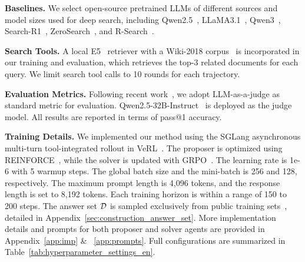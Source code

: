 \documentclass[10pt, a4paper, logo]{googledeepmind} %
\begin{document}
\textbf{Baselines.} We select open-source pretrained LLMs of different sources and model sizes used for deep search, including Qwen2.5~\citep{yang2024qwen2p5}, LLaMA3.1~\citep{dubey2024llama}, Qwen3~\citep{yang2025qwen3}, Search-R1~\citep{jin2025search,jin2025empirical}, ZeroSearch~\citep{sun2025zerosearch}, and R-Search~\citep{zhao2025rsearch}.

\textbf{Search Tools.} A local E5~\citep{wang2022text} retriever with a Wiki-2018 corpus~\citep{karpukhin2020dense} is incorporated in our training and evaluation, which retrieves the top-3 related documents for each query. We limit search tool calls to 10 rounds for each trajectory.

\textbf{Evaluation Metrics.} Following recent work~\citep{gao2025asearcher}, we adopt LLM-as-a-judge as standard metric for evaluation. Qwen2.5-32B-Instruct~\citep{yang2024qwen2p5} is deployed as the judge model. All results are reported in terms of pass@1 accuracy.

\textbf{Training Details.} We implemented our method using the SGLang asynchronous multi-turn tool-integrated rollout in VeRL~\citep{sheng2024hybridflow}. The proposer is optimized using REINFORCE~\citep{williams1992simple}, while the solver is updated with GRPO~\citep{shao2024deepseekmath}. The learning rate is  1e-6 with 5 warmup steps. The global batch size and the mini-batch is 256 and 128, respectively. The maximum prompt length is 4,096 tokens, and the response length is set to 8,192 tokens. Each training horizon is within a range of 150 to 200 steps. The answer set ${\mathcal{D}}$ is sampled exclusively from public training sets~\citep{jin2025search,dong2025agentic}, detailed in Appendix~\ref{sec:construction_answer_set}. More implementation details and prompts for both proposer and solver agents are provided in Appendix~\ref{app:imp} \& ~\ref{app:prompts}.
Full configurations are summarized in Table~\ref{tab:hyperparameter_settings_en}.
\end{document}
